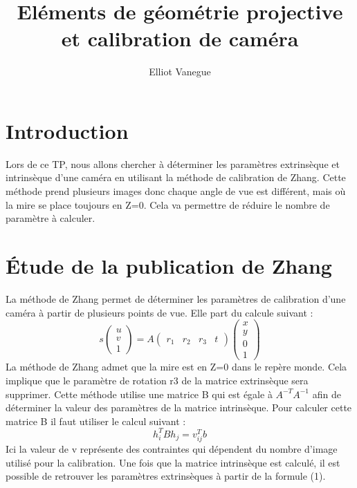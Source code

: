 \documentclass[a4paper,10pt]{article}
\title{Eléments de géométrie projective et calibration de caméra}
\author{Elliot Vanegue}
\begin{document}
\maketitle
\newpage
\renewcommand{\contentsname}{Sommaire}
\tableofcontents
\newpage

\section{Introduction}
Lors de ce TP, nous allons chercher à déterminer les paramètres extrinsèque et 
intrinsèque d'une caméra en utilisant la méthode de calibration de Zhang.
Cette méthode prend plusieurs images donc chaque angle de vue est différent, mais
où la mire se place toujours en Z=0. Cela va permettre de réduire le nombre de paramètre
à calculer.

\section{Étude de la publication de Zhang}

La méthode de Zhang permet de déterminer les paramètres de calibration d'une caméra
à partir de plusieurs points de vue. Elle part du calcule suivant :
\begin{equation}
 s\begin{pmatrix}u\\v\\1\end{pmatrix} = A\begin{pmatrix}r_1&r_2&r_3&t\end{pmatrix}\begin{pmatrix}x\\y\\0\\1\end{pmatrix}
\end{equation}
La méthode de Zhang admet que la mire est en Z=0 dans le repère monde. Cela
implique que le paramètre de rotation r3 de la matrice extrinsèque sera supprimer.
Cette méthode utilise une matrice B qui est égale à $A^{-T}A^{-1}$ afin de déterminer la valeur
des paramètres de la matrice intrinsèque. Pour calculer cette matrice B il faut utiliser le
calcul suivant : 
\begin{equation}
 h^T_iBh_j=v^T_{ij}b
\end{equation}
Ici la valeur de v représente des contraintes qui dépendent du nombre d'image utilisé pour 
la calibration.
Une fois que la matrice intrinsèque est calculé, il
est possible de retrouver les paramètres extrinsèques à partir de la formule (1).
\end{document}
